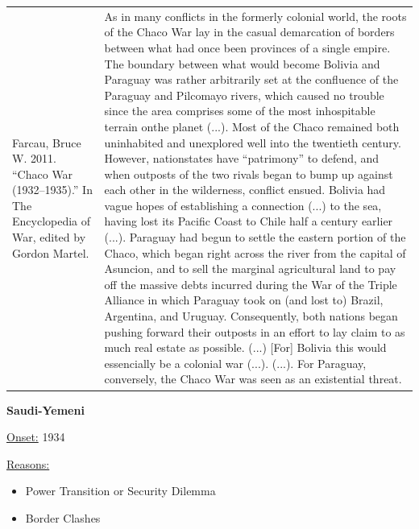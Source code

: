 {\begin{longtable}{p{}p{}}
Farcau, Bruce W. 2011. “Chaco War (1932–1935).” In The Encyclopedia of War, edited by Gordon Martel. & As in many conflicts in the formerly colonial world, the roots of the Chaco War lay in the casual demarcation of borders between what had once been provinces of a single empire. The boundary between what would become Bolivia and Paraguay was rather arbitrarily set at the confluence of the Paraguay and Pilcomayo rivers, which caused no trouble since the area comprises some of the most inhospitable terrain onthe planet (...). Most of the Chaco remained both uninhabited and unexplored well into the twentieth century. However, nationstates have “patrimony” to defend, and when outposts of the two rivals began to bump up against each other in the wilderness, conflict ensued. Bolivia had vague hopes of establishing a connection (...) to the sea, having lost its Pacific Coast to Chile half a century earlier (...). Paraguay had begun to settle the eastern portion of the Chaco, which began right across the river from the capital of Asuncion, and to sell the marginal agricultural land to pay off the massive debts incurred during the War of the Triple Alliance in which Paraguay took on (and lost to) Brazil, Argentina, and Uruguay. Consequently, both nations began pushing forward their outposts in an effort to lay claim to as much real estate as possible. (...) [For] Bolivia this would essencially be a colonial war (...). (...). For Paraguay, conversely, the Chaco War was seen as an existential threat.
\\
\end{longtable}}
\clearpage
         \textbf{Saudi-Yemeni} 

          \underline{Onset:} 1934         

\underline{Reasons:}
\begin{itemize}
\item Power Transition or Security Dilemma
\item Border Clashes
\end{itemize}

